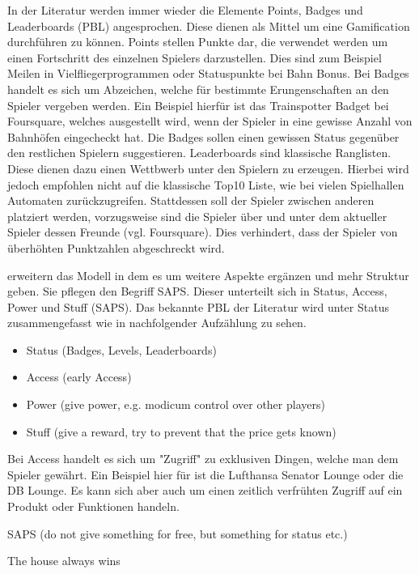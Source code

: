 In der Literatur werden immer wieder die Elemente Points, Badges und Leaderboards (PBL) angesprochen. Diese dienen als Mittel um eine Gamification durchführen zu können. 
Points stellen Punkte dar, die verwendet werden um einen Fortschritt des einzelnen Spielers darzustellen. Dies sind zum Beispiel Meilen in Vielfliegerprogrammen oder Statuspunkte bei Bahn Bonus.
Bei Badges handelt es sich um Abzeichen, welche für bestimmte Erungenschaften an den Spieler vergeben werden. Ein Beispiel hierfür ist das Trainspotter Badget bei Foursquare, welches ausgestellt wird, wenn der Spieler in eine gewisse Anzahl von Bahnhöfen eingecheckt hat. Die Badges sollen einen gewissen Status gegenüber den restlichen Spielern suggestieren.
Leaderboards sind klassische Ranglisten. Diese dienen dazu einen Wettbwerb unter den Spielern zu erzeugen. Hierbei wird jedoch empfohlen nicht auf die klassische Top10 Liste, wie bei vielen Spielhallen Automaten zurückzugreifen. Stattdessen soll der Spieler zwischen anderen platziert werden, vorzugsweise sind die Spieler über und unter dem aktueller Spieler dessen Freunde (vgl. Foursquare). Dies verhindert, dass der Spieler von überhöhten Punktzahlen abgeschreckt wird.

\cite{Zichermann.2011} erweitern das Modell in dem es um weitere Aspekte ergänzen und mehr Struktur geben.
Sie pflegen den Begriff SAPS. Dieser unterteilt sich in Status, Access, Power und Stuff (SAPS).
Das bekannte PBL der Literatur wird unter Status zusammengefasst wie in nachfolgender Aufzählung zu sehen.

\begin{itemize}
      \item Status (Badges, Levels, Leaderboards)
      \item Access (early Access)
      \item Power (give power, e.g. modicum control over other players)
      \item Stuff (give a reward, try to prevent that the price gets known)
\end{itemize}

Bei Access handelt es sich um "Zugriff" zu exklusiven Dingen, welche man dem Spieler gewährt. Ein Beispiel hier für ist die Lufthansa Senator Lounge oder die DB Lounge.
Es kann sich aber auch um einen zeitlich verfrühten Zugriff auf ein Produkt oder Funktionen handeln.



SAPS (do not give something for free, but something for status etc.)

The house always wins


